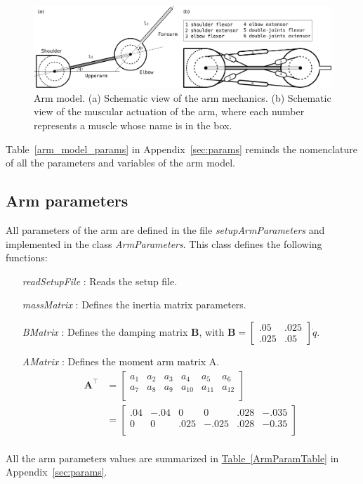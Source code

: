 \documentclass[pdftex,a4paper,11pt]{article}
\begin{document}
\begin{figure}[hbt]
\centering
	\includegraphics[width=0.9\columnwidth]{figures/arm_model_horiz.pdf}
	\caption{Arm model. (a) Schematic view of the arm mechanics. (b) Schematic view of the muscular actuation of the arm, where each number represents a muscle whose name is in the box.}
	\label{fig:arm_model}
\end{figure}

Table~\ref{arm_model_params} in Appendix~\ref{sec:params} reminds the nomenclature of all the parameters and variables of the arm model. 

\subsection{Arm parameters}
\label{sec:arm_parameters}
All parameters of the arm are defined in the file \textit{setupArmParameters} and implemented in the class \textit{ArmParameters}.
This class defines the following functions:
\begin{itemize}
\item[\textit{readSetupFile}]: Reads the setup file.
\item[\textit{massMatrix}]: Defines the inertia matrix parameters.
\item[\textit{BMatrix}]: Defines the damping matrix \textbf{B}, with
$\textbf{B} = \begin{bmatrix}
           .05 & .025 \\
          .025 & .05
     \end{bmatrix} \dot{q}.$\\
\item[\textit{AMatrix}]: Defines the moment arm matrix A.
\begin{align*}
  \textbf{A}^\top        & = \begin{bmatrix}
    a_{1} & a_{2} & a_{3} & a_{4} & a_{5} & a_{6} \\
    a_{7} & a_{8} & a_{9} & a_{10} & a_{11} & a_{12} \\
  \end{bmatrix} \\
  & = \begin{bmatrix}
    .04 & -.04 &    0 &     0 & .028 & -.035 \\
    0 &    0 & .025 & -.025 & .028 & -0.35 \\
  \end{bmatrix}\\
\end{align*}
\end{itemize}
All the arm parameters values are summarized in \hyperref[ArmParamTable]{Table~\ref{ArmParamTable}} in Appendix~\ref{sec:params}.
\end{document}
